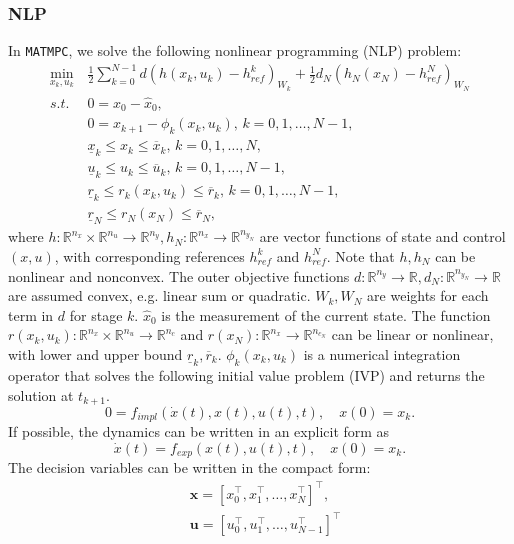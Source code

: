 \documentclass{article}
\newcommand{\software}[1]{{\tt#1}}
\begin{document}
\subsubsection{NLP}
In \software{MATMPC}, we solve the following nonlinear programming (NLP) problem:
\begin{equation}\label{NLP}
	\begin{aligned}
	\min_{x_k,u_k} \,&\frac{1}{2}\sum_{k=0}^{N-1} d(h(x_k,u_k)-h_{ref}^k)_{W_k}+\frac{1}{2}d_N(h_N(x_N)-h_{ref}^N)_{W_N}\\
	s.t.\, &0=x_0-\hat{x}_0,\\
	&0=x_{k+1}-\phi_k(x_k,u_k),\, k=0,1,\ldots,N-1,\\
	&\underline{x}_k\leq x_k\leq \overline{x}_k,\,k=0,1,\ldots,N,\\
	&\underline{u}_k\leq u_k\leq \overline{u}_k,\,k=0,1,\ldots,N-1,\\
	&\underline{r}_k\leq r_k(x_k,u_k)\leq \overline{r}_k, \,k=0,1,\ldots,N-1,\\
	&\underline{r}_N\leq r_N(x_N)\leq \overline{r}_N,
	\end{aligned}
\end{equation}
where $h:\mathbb{R}^{n_x}\times\mathbb{R}^{n_u}\rightarrow \mathbb{R}^{n_y},h_N:\mathbb{R}^{n_x}\rightarrow\mathbb{R}^{n_{y_N}}$ are vector functions of state and control $(x,u)$, with corresponding references $h_{ref}^k$ and $h_{ref}^N$. Note that $h,h_N$ can be nonlinear and nonconvex. The outer objective functions $d:\mathbb{R}^{n_y}\rightarrow \mathbb{R}, d_N:\mathbb{R}^{n_{y_N}}\rightarrow \mathbb{R}$ are assumed convex, e.g. linear sum or quadratic. $W_k,W_N$ are weights for each term in $d$ for stage $k$. $\hat{x}_0$ is the measurement of the current state. The function $r(x_k,u_k): \mathbb{R}^{n_x}\times\mathbb{R}^{n_u} \rightarrow \mathbb{R}^{n_c}$ and $r(x_N): \mathbb{R}^{n_x}\rightarrow \mathbb{R}^{n_{c_N}}$ can be linear or nonlinear, with lower and upper bound $\underline{r}_k, \overline{r}_k$. $\phi_k(x_k,u_k)$ is a numerical integration operator that solves the following initial value problem (IVP) and returns the solution at $t_{k+1}$.
\begin{equation}
0=f_{impl}(\dot{x}(t), x(t),u(t),t),\quad x(0)=x_k.
\end{equation}
If possible, the dynamics can be written in an explicit form as
\begin{equation}
\dot{x}(t)=f_{exp}(x(t),u(t),t),\quad x(0)=x_k.
\end{equation}
The decision variables can be written in the compact form:
\begin{equation}
\begin{aligned}
&\mathbf{x}= \left [x_0^\top, x_1^\top,\dots, x_N^\top\right ]^\top,\\
&\mathbf{u}= \left [u_0^\top, u_1^\top,\dots, u_{N-1}^\top\right ]^\top
\end{aligned}
\end{equation}
\end{document}
